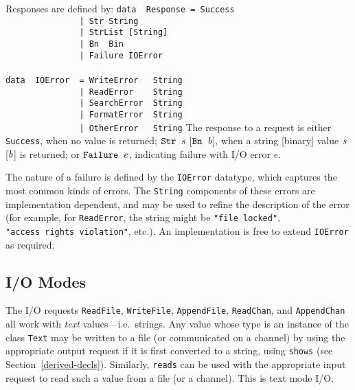 Responses are defined by:
\bprog
\mbox{\tt data\ \ Response\ =\ Success}\\
\mbox{\tt \ \ \ \ \ \ \ \ \ \ \ \ \ \ \ |\ Str\ String}\\
\mbox{\tt \ \ \ \ \ \ \ \ \ \ \ \ \ \ \ |\ StrList\ [String]}\\
\mbox{\tt \ \ \ \ \ \ \ \ \ \ \ \ \ \ \ |\ Bn\ \ Bin}\\
\mbox{\tt \ \ \ \ \ \ \ \ \ \ \ \ \ \ \ |\ Failure\ IOError}\\
\mbox{\tt }\\[-8pt]
\mbox{\tt data\ \ IOError\ \ =\ WriteError\ \ \ String}\\
\mbox{\tt \ \ \ \ \ \ \ \ \ \ \ \ \ \ \ |\ ReadError\ \ \ \ String}\\
\mbox{\tt \ \ \ \ \ \ \ \ \ \ \ \ \ \ \ |\ SearchError\ \ String}\\
\mbox{\tt \ \ \ \ \ \ \ \ \ \ \ \ \ \ \ |\ FormatError\ \ String}\\
\mbox{\tt \ \ \ \ \ \ \ \ \ \ \ \ \ \ \ |\ OtherError\ \ \ String}
\eprog%
%
%
%
%
%
%
The response to a request is either \mbox{\tt Success}, when no value is
returned; \mbox{$\it \makebox{\tt Str\ }s$} [\mbox{$\it \makebox{\tt Bn\ }b$}], when a string [binary] value \mbox{$\it s$} [\mbox{$\it b$}]
is returned; or \mbox{$\it \makebox{\tt Failure\ }e$},
indicating failure with I/O error $e$.

The nature of a failure is defined by the \mbox{\tt IOError} datatype, which
captures the most common kinds of errors.  The \mbox{\tt String} components of
these errors are implementation dependent, and may be used to refine
the description of the error (for example, for \mbox{\tt ReadError}, the
string might be \mbox{\tt "file\ locked"}, \mbox{\tt "access\ rights\ violation"}, etc.).
An implementation is free to extend \mbox{\tt IOError} as required.

\subsection{I/O Modes}
\label{io-modes}

The I/O requests \mbox{\tt ReadFile}, \mbox{\tt WriteFile}, \mbox{\tt AppendFile}, \mbox{\tt ReadChan},
and \mbox{\tt AppendChan} all work with {\em text} values---i.e.~strings.  Any
value whose type is an instance of the class \mbox{\tt Text} may be written to
a file (or communicated on a channel) by using the appropriate output
request if it is first converted to a string, using \mbox{\tt shows} (see
Section~\ref{derived-decls}).  Similarly, \mbox{\tt reads} can be used with the
appropriate input request to read such a value from a file (or a
channel).  This is text mode I/O.

